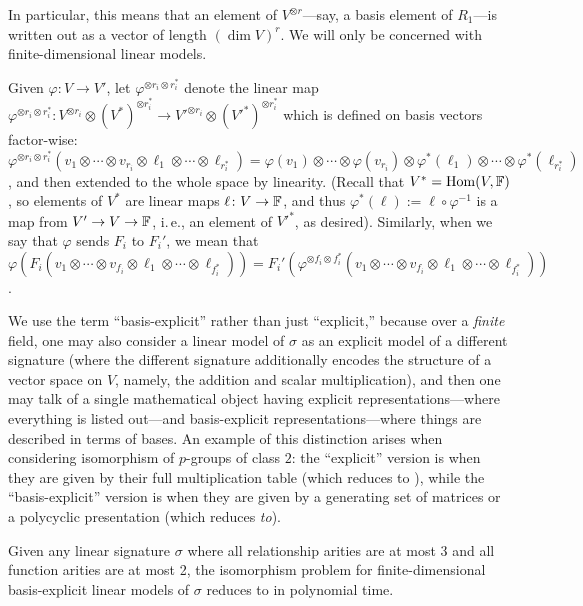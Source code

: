 \documentclass[11pt]{article}
\begin{document}
In particular, this means that an element of $V^{\otimes r}$---say, a basis element of $R_1$---is written out as a vector of length $(\dim V)^r$. We will only be concerned with finite-dimensional linear models.

Given $\varphi \colon V \to V'$, let $\varphi^{\otimes r_i \otimes r_i^*}$ denote the linear map $\varphi^{\otimes r_i \otimes r_i^*}\colon V^{\otimes r_i} \otimes (V^*)^{\otimes r_i^*} \to V'^{\otimes r_i} \otimes (V'^*)^{\otimes r_i^*}$ which is defined on basis vectors factor-wise: $\varphi^{\otimes r_i \otimes r_i^*}(v_1 \otimes \dotsb \otimes v_{r_i} \otimes \ell_1 \otimes \dotsb \otimes \ell_{r_i^*}) = \varphi(v_1) \otimes \dotsb \otimes \varphi(v_{r_i}) \otimes \varphi^*(\ell_1) \otimes \dotsb \otimes \varphi^*(\ell_{r_i^*})$, and then extended to the whole space by linearity. (Recall that $V^* = \mathrm{Hom}(V, \mathbb{F})$, so elements of $V^*$ are linear maps $\ell\colon V \to \mathbb{F}$, and thus $\varphi^*(\ell) := \ell \circ \varphi^{-1}$ is a map from $V' \to V \to \mathbb{F}$, i.\,e., an element of $V'^*$, as desired). Similarly, when we say that $\varphi$ sends $F_i$ to $F_i'$, we mean that $\varphi(F_i(v_1 \otimes \dotsb \otimes v_{f_i} \otimes \ell_1 \otimes \dotsb \otimes \ell_{f_i^*})) = F_i'(\varphi^{\otimes f_i \otimes f_i^*}(v_1 \otimes \dotsb \otimes v_{f_i} \otimes \ell_1 \otimes \dotsb \otimes \ell_{f_i^*}))$.


\begin{remark}
We use the term ``basis-explicit'' rather than just ``explicit,'' because over a \emph{finite} field, one may also consider a linear model of $\sigma$ as an explicit model of a different signature (where the different signature additionally encodes the structure of a vector space on $V$, namely, the addition and scalar multiplication), and then one may talk of a single mathematical object having explicit representations---where everything is listed out---and basis-explicit representations---where things are described in terms of bases. An example of this distinction arises when considering isomorphism of $p$-groups of class $2$: the ``explicit'' version is when they are given by their full multiplication table (which reduces to \GI), while the ``basis-explicit'' version is when they are given by a generating set of matrices or a polycyclic presentation (which \GI reduces \emph{to}). 
\end{remark}

\begin{theorem}
Given any linear signature $\sigma$ where all relationship arities are at most 3 and all function arities are at most 2, the isomorphism problem for finite-dimensional basis-explicit linear models of $\sigma$ reduces to \ThreeTIlong in polynomial time.
\end{theorem}
\end{document}
